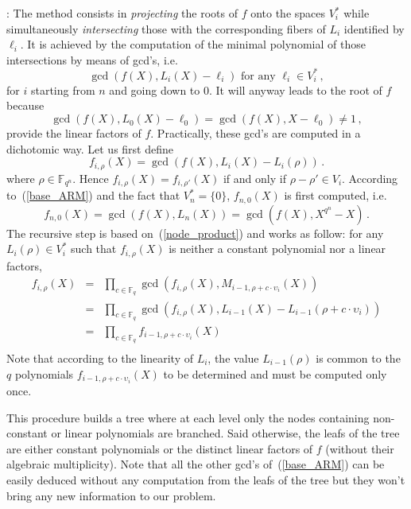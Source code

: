 \documentclass{sig-alternate}
\newcommand{\ff}[1]{\mathbb{F}_{#1}}
\newcommand{\qq}{q}
\newcommand{\nn}{n}
\newcommand{\qn}{{\qq^\nn}}
\newcommand{\basef}{\ff{\qq}}
\newcommand{\extf}{\ff{\qn}}
\begin{document}
: The method consists in \emph{projecting} the roots of $f$ onto the spaces $V_i^\ast$ while simultaneously \emph{intersecting} those with the corresponding fibers of $L_i$ identified by $\ell_i$.
 It is achieved by the computation of the minimal polynomial of those intersections by means of gcd's, i.e. 
 \begin{equation}
 \label{base_ARM}
\gcd(f(X),L_i(X)-\ell_i)     \mbox{ for any }  \ell_i  \in V_i^\ast\,,
\end{equation}
for $i$ starting from $n$ and going down to 0.
It will anyway leads to the root of $f$ because 
$$\gcd(f(X),L_0(X)-\ell_0)=\gcd(f(X),X-\ell_0) \ne 1\,,$$ 
provide the linear factors of $f$. Practically, these gcd's are computed in a dichotomic way. Let us first define
 $$f_{i,\rho}(X)=\gcd(f(X),L_i(X)-L_i(\rho))\,.$$
where $\rho \in \extf$. Hence $f_{i,\rho}(X)=f_{i,\rho'}(X)$ if and only if $\rho-\rho' \in V_i$.
According to~(\ref{base_ARM}) and the fact that $V_n^\ast=\{0\}$, $f_{n,0}(X)$ is first computed, i.e.
 $$f_{n,0}(X)=\gcd(f(X),L_n(X))=\gcd(f(X),X^{q^\nn}-X)\,.$$
The recursive step is based on~(\ref{node_product}) and works as follow: for any $L_i(\rho) \in V_i^\ast$ such that $f_{i,\rho}(X)$ is neither a constant polynomial nor a linear factors,
  $$
  \begin{array}{lll}
  f_{i,\rho}(X)&=&\prod_{c \in \basef} \gcd(f_{i,\rho}(X),M_{i-1,\rho+c \cdot \upsilon_i}(X)) \\
               &=&\prod_{c \in \basef} \gcd(f_{i,\rho}(X),L_{i-1}(X)-L_{i-1}(\rho+c \cdot \upsilon_i)) \\
               &=&\prod_{c \in \basef} f_{i-1,\rho+c \cdot  \upsilon_i}(X)\\
  \end{array}              
  $$ 
 Note that according to the linearity of $L_i$, the value $L_{i-1}(\rho)$ is common to the $\qq$ polynomials $f_{i-1,\rho+c \cdot  \upsilon_i}(X)$ to be determined and must be computed only once. 
 
 This procedure builds a tree where at each level only the nodes containing non-constant or linear polynomials are branched. Said otherwise, the leafs of the tree are either constant polynomials or the distinct
 linear factors of $f$ (without their algebraic multiplicity). Note that all the other gcd's of~(\ref{base_ARM}) can be easily deduced without any computation from the leafs of the tree but they won't bring any new information to our problem.
 

  
\end{document}
